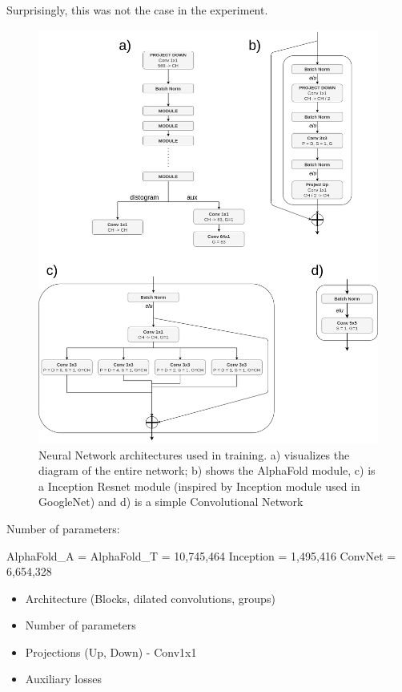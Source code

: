     
Surprisingly, this was not the case in the experiment.

\begin{figure}
    \centering
    \includegraphics[width=\linewidth]{imgs_tomas/Architectures.png}
    \caption{Neural Network architectures used in training. a) visualizes the diagram of the entire network; b) shows the AlphaFold module, c) is a Inception Resnet module (inspired by Inception module used in GoogleNet) and d) is a simple Convolutional Network}
    \label{fig:architectures}
\end{figure}

Number of parameters:

AlphaFold\_A = 
AlphaFold\_T = 10,745,464
Inception = 1,495,416
ConvNet = 6,654,328

\begin{itemize}
    \item Architecture (Blocks, dilated convolutions, groups)
    \item Number of parameters
    \item Projections (Up, Down) - Conv1x1
    \item Auxiliary losses
\end{itemize}


